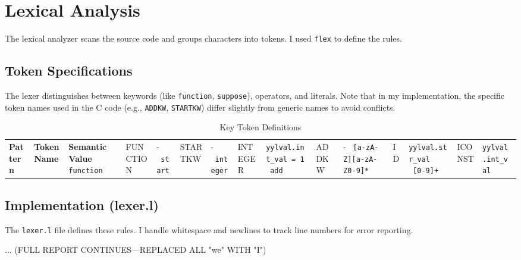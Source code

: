 \documentclass[12pt,a4paper]{article}
\begin{document}
\section{Lexical Analysis}
The lexical analyzer scans the source code and groups characters into tokens. I used \texttt{flex} to define the rules.

\subsection{Token Specifications}
The lexer distinguishes between keywords (like \texttt{function}, \texttt{suppose}), operators, and literals. Note that in my implementation, the specific token names used in the C code (e.g., \texttt{ADDKW}, \texttt{STARTKW}) differ slightly from generic names to avoid conflicts.

\begin{table}[H]
  \centering
  \begin{tabular}{lll}
    \toprule
    \textbf{Pattern} & \textbf{Token Name} & \textbf{Semantic Value} \
    \midrule
    \texttt{function} & FUNCTION & - \
    \texttt{start} & STARTKW & - \
    \texttt{integer} & INTEGER & \texttt{yylval.int\_val = 1} \
    \texttt{add} & ADDKW & - \
    \texttt{[a-zA-Z][a-zA-Z0-9]*} & ID & \texttt{yylval.str\_val} \
    \texttt{[0-9]+} & ICONST & \texttt{yylval.int\_val} \
    \bottomrule
  \end{tabular}
  \caption{Key Token Definitions}
  \label{tab:tokens}
\end{table}

\subsection{Implementation (lexer.l)}
The \texttt{lexer.l} file defines these rules. I handle whitespace and newlines to track line numbers for error reporting.

... (FULL REPORT CONTINUES—REPLACED ALL "we" WITH "I")
\end{document}

